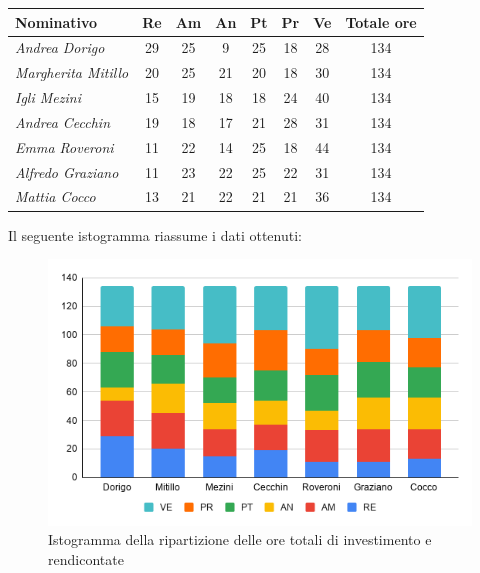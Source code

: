 {{{{{{{{{{{	\begin{center}
		\renewcommand{\arraystretch}{1.4}
		\begin{tabularx}{\textwidth}{|X|c|c|c|c|c|c|c|}
			\hline
			\rowcolor{airforceblue}
			\textbf{Nominativo} & \textbf{Re} & \textbf{Am} & \textbf{An} & \textbf{Pt} & \textbf{Pr} & \textbf{Ve} & \textbf{Totale ore}\\
			\hline
			\textit{Andrea Dorigo} & 29 & 25 & 9 & 25 & 18 & 28 & 134\\
			\hline
			\textit{Margherita Mitillo} & 20 & 25 & 21 & 20 & 18 & 30 & 134\\
			\hline
			\textit{Igli Mezini} & 15 & 19 & 18 & 18 & 24 & 40 & 134\\
			\hline
			\textit{Andrea Cecchin} & 19 & 18 & 17 & 21 & 28 & 31 & 134\\
			\hline
			\textit{Emma Roveroni} & 11 & 22 & 14 & 25 & 18 & 44 & 134\\
			\hline
			\textit{Alfredo Graziano} & 11 & 23 & 22 & 25 & 22 & 31 & 134\\
			\hline
			\textit{Mattia Cocco} & 13 & 21 & 22 & 21 & 21 & 36 & 134\\
			\hline
		\end{tabularx}
	\end{center}

Il seguente istogramma riassume i dati ottenuti:
\begin{figure}[!ht]
	\begin{center}
		\includegraphics[width=0.8\linewidth]{../immagini/pdp/istogramma_suddivisione_lavoro.png}
		\caption{Istogramma della ripartizione delle ore totali di investimento e rendicontate}
	\end{center}
\end{figure}

}}}}}}}}}}}
